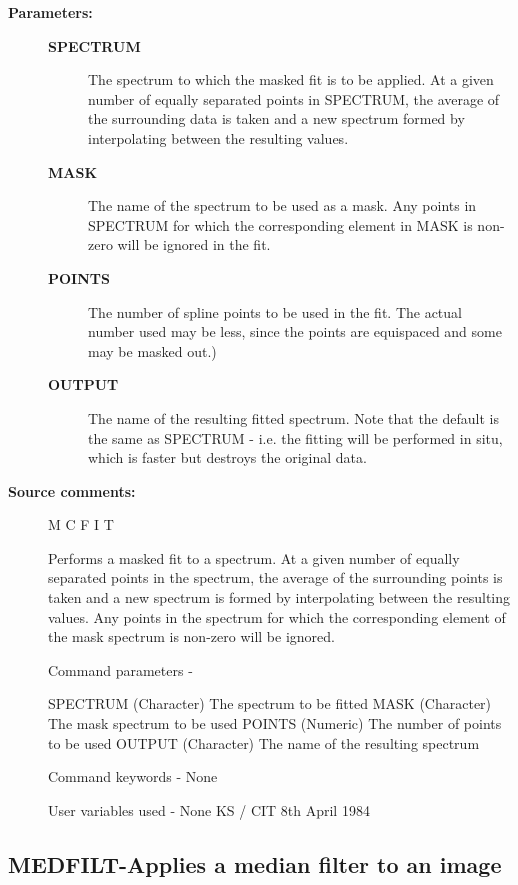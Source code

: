 \begin{description}
\begin{description}
\item [\textbf{Parameters:}]
\begin{description}
\item [\textbf{SPECTRUM}]
 The spectrum to which the masked fit is
 to be applied.  At a given number of equally separated
 points in SPECTRUM, the average of the surrounding
 data is taken and a new spectrum formed by interpolating
 between the resulting values.
\item [\textbf{MASK}]
 The name of the spectrum to be used as a mask.  Any
 points in SPECTRUM for which the corresponding element in
 MASK is non-zero will be ignored in the fit.
\item [\textbf{POINTS}]
 The number of spline points to be used in the fit.
 The actual number used may be less, since the points are
 equispaced and some may be masked out.)
\item [\textbf{OUTPUT}]
 The name of the resulting fitted spectrum.  Note
 that the default is the same as SPECTRUM - i.e. the fitting
 will be performed in situ, which is faster but destroys the
 original data.
\end{description}

\item [\textbf{Source comments:}]
\begin{terminalv}
 M C F I T

 Performs a masked fit to a spectrum.  At a given number of
 equally separated points in the spectrum, the average of the
 surrounding points is taken and a new spectrum is formed by
 interpolating between the resulting values.  Any points in the
 spectrum for which the corresponding element of the mask spectrum
 is non-zero will be ignored.

 Command parameters -

 SPECTRUM     (Character) The spectrum to be fitted
 MASK         (Character) The mask spectrum to be used
 POINTS       (Numeric) The number of points to be used
 OUTPUT       (Character) The name of the resulting spectrum

 Command keywords - None

 User variables used - None
                                KS / CIT 8th April 1984
\end{terminalv}
\end{description}
\subsection{MEDFILT-\label{MEDFILT}Applies a median filter to an image}
\begin{description}


\end{description}
\end{description}
